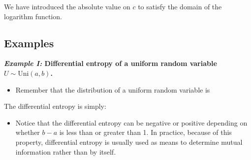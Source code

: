 We have introduced the absolute value on $c$ to satisfy the domain of the logarithm function.

\subsection{Examples}
\textbf{\textit{Example I:} Differential entropy of a uniform random variable $U \sim \text{Uni}(a, b)$.}
\begin{itemize}
\item Remember that the distribution of a uniform random variable is 
\end{itemize}
The differential entropy is simply:
\begin{itemize}
\item Notice that the differential entropy can be negative or positive depending on whether $b - a$ is less than or greater than 1. In practice, because of this property, differential entropy is usually used as means to determine mutual information rather than by itself.
\end{itemize}


